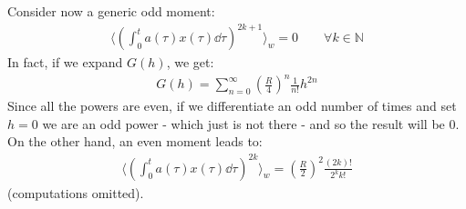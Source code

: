 \documentclass[../template.tex]{subfiles}
\begin{document}
\begin{example}
    Consider now a generic odd moment:
    \begin{align*}
        \langle \left(\int_0^t a(\tau)x(\tau) \dd{\tau}\right)^{2k+1} \rangle_w = 0 \qquad \forall k \in \mathbb{N}
    \end{align*}
    In fact, if we expand $G(h)$, we get:
    \begin{align*}
        G(h) = \sum_{n=0}^\infty
     \left(\frac{R}{4} \right)^n \frac{1}{n!} h^{2n} \end{align*}
    Since all the powers are even, if we differentiate an odd number of times and set $h=0$ we are  an odd power - which just is not there - and so the result will be $0$.\\
    On the other hand, an even moment leads to:
    \begin{align*}
        \langle \left(\int_0^t a(\tau) x(\tau) \dd{\tau}\right)^{2k} \rangle_w = \left(\frac{R}{2} \right)^2 \frac{(2k)!}{2^{k} k!} 
    \end{align*}
    (computations omitted).
        
\end{example}
\end{document}
